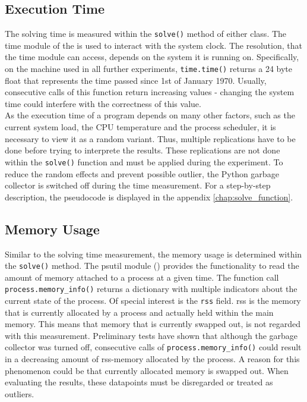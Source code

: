 \documentclass[./\jobname.tex]{subfiles}
\begin{document}
\subsection{Execution Time}
\label{chap:metric_time}
The solving time is measured within the \colorbox{light-gray}{\lstinline[basicstyle=\ttfamily\color{black}]|solve()|} method of either class. The time module of the \cite{python_standard_library_time_2020} is used to interact with the system clock. The resolution, that the time module can access, depends on the system it is running on. Specifically, on the machine used in all further experiments, \colorbox{light-gray}{\lstinline[basicstyle=\ttfamily\color{black}]|time.time()|} returns a 24 byte float that represents the time passed since 1st of January 1970. Usually, consecutive calls of this function return increasing values - changing the system time could interfere with the correctness of this value.\\ 

As the execution time of a program depends on many other factors, such as the current system load, the CPU temperature and the process scheduler, it is necessary to view it as a random variant. Thus, multiple replications have to be done before trying to interprete the results. These replications are not done within the \colorbox{light-gray}{\lstinline[basicstyle=\ttfamily\color{black}]|solve()|} function and must be applied during the experiment. To reduce the random effects and prevent possible outlier, the Python garbage collector is switched off during the time measurement. For a step-by-step description, the pseudocode is displayed in the appendix \ref{chap:solve_function}. 

\subsection{Memory Usage}
\label{chap:metric_mem}
Similar to the solving time measurement, the memory usage is determined within the \colorbox{light-gray}{\lstinline[basicstyle=\ttfamily\color{black}]|solve()|} method. The psutil module (\cite{rodola_psutil_2020}) provides the functionality to read the amount of memory attached to a process at a given time. The function call \colorbox{light-gray}{\lstinline[basicstyle=\ttfamily\color{black}]|process.memory_info()|} returns a dictionary with multiple indicators about the current state of the process. Of special interest is the \colorbox{light-gray}{\lstinline[basicstyle=\ttfamily\color{black}]|rss|} field. \gls{rss} is the memory that is currently allocated by a process and actually held within the main memory. This means that memory that is currently swapped out, is not regarded with this measurement. Preliminary tests have shown that although the garbage collector was turned off, consecutive calls of \colorbox{light-gray}{\lstinline[basicstyle=\ttfamily\color{black}]|process.memory_info()|} could result in a decreasing amount of rss-memory allocated by the process. A reason for this phenomenon could be that currently allocated memory is swapped out. When evaluating the results, these datapoints must be disregarded or treated as outliers. \\
\end{document}
